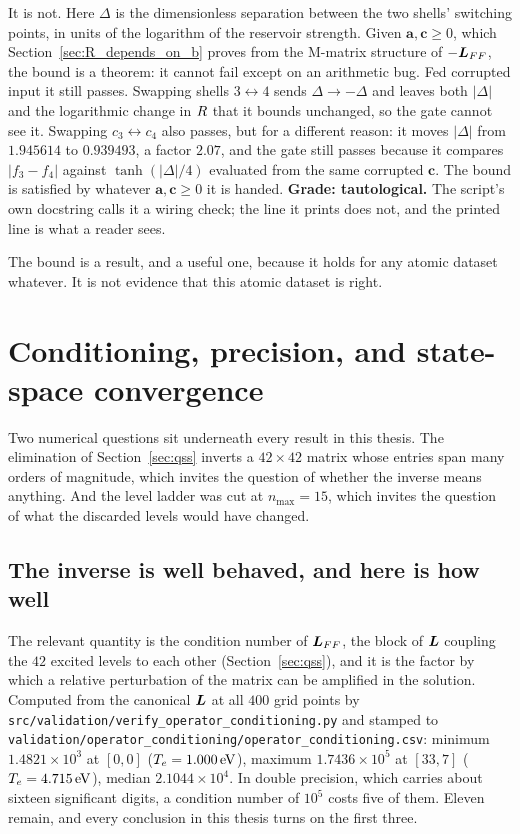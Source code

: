 It is not. Here $\Delta$ is the dimensionless separation between the two shells'
switching points, in units of the logarithm of the reservoir strength. Given
$\bm{a},\bm{c}\ge0$, which Section~\ref{sec:R_depends_on_b} proves from the
M-matrix structure of $-\bm{L}_{FF}$, the bound is a theorem: it cannot fail
except on an arithmetic bug. Fed corrupted input it still passes. Swapping
shells $3\leftrightarrow4$ sends $\Delta\to-\Delta$ and leaves both $|\Delta|$
and the logarithmic change in $R$ that it bounds unchanged, so the gate
cannot see it. Swapping $c_3\leftrightarrow c_4$ also
passes, but for a different reason: it moves $|\Delta|$ from $1.945614$ to
$0.939493$, a factor $2.07$, and the gate still passes because it compares
$|f_3-f_4|$ against $\tanh(|\Delta|/4)$ evaluated from the same corrupted
$\bm{c}$. The bound is satisfied by whatever $\bm{a},\bm{c}\ge0$ it is
handed.
\textbf{Grade: tautological.} The script's own docstring calls it a wiring
check; the line it prints does not, and the printed line is what a reader sees.

The bound is a result, and a useful one, because it holds for any atomic dataset
whatever. It is not evidence that this atomic dataset is right.

\section{Conditioning, precision, and state-space convergence}
\label{sec:conditioning}

Two numerical questions sit underneath every result in this thesis. The
elimination of Section~\ref{sec:qss} inverts a $42\times42$ matrix whose entries
span many orders of magnitude, which invites the question of whether the inverse
means anything. And the level ladder was cut at $n_{\max}=15$, which invites the
question of what the discarded levels would have changed.

\subsection{The inverse is well behaved, and here is how well}

The relevant quantity is the condition number of $\bm{L}_{FF}$, the block of
$\bm{L}$ coupling the $42$ excited levels to each other
(Section~\ref{sec:qss}), and it is the factor by which a relative perturbation
of the matrix can be amplified in the solution.
Computed from the canonical $\bm{L}$ at all $400$ grid points by
\texttt{src/validation/verify\_operator\_conditioning.py} and stamped to
\texttt{validation/operator\_conditioning/operator\_conditioning.csv}: minimum
$1.4821\times10^{3}$ at $[0,0]$ ($T_e = \SI{1.000}{\electronvolt}$), maximum
$1.7436\times10^{5}$ at $[33,7]$ ($T_e = \SI{4.715}{\electronvolt}$), median
$2.1044\times10^{4}$. In double precision, which carries about sixteen
significant digits, a condition number of $10^{5}$ costs five of them. Eleven
remain, and every conclusion in this thesis turns on the first three.

